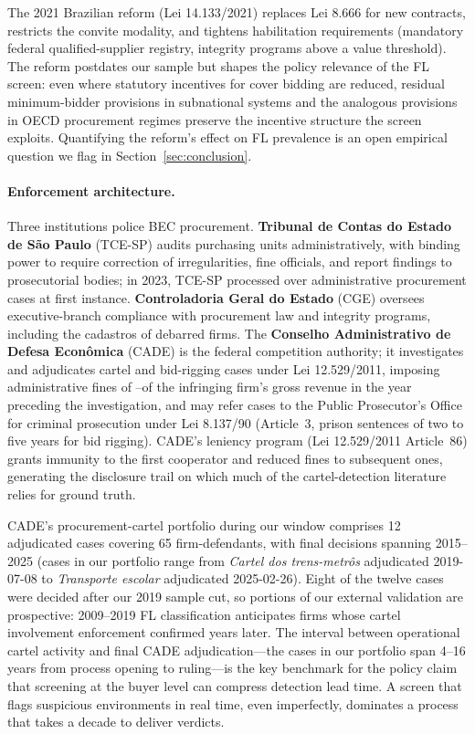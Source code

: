 The 2021 Brazilian reform (Lei 14.133/2021) replaces Lei 8.666
for new contracts, restricts the convite modality, and
tightens habilitation requirements (mandatory federal
qualified-supplier registry, integrity programs above a value
threshold). The reform postdates our sample but shapes the
policy relevance of the FL screen: even where statutory
incentives for cover bidding are reduced, residual minimum-bidder
provisions in subnational systems and the analogous provisions
in OECD procurement regimes preserve the incentive structure
the screen exploits. Quantifying the reform's effect on FL
prevalence is an open empirical question we flag in
Section~\ref{sec:conclusion}.

\paragraph{Enforcement architecture.}
Three institutions police BEC procurement.
\textbf{Tribunal de Contas do Estado de S\~ao Paulo} (TCE-SP)
audits purchasing units administratively, with binding power to
require correction of irregularities, fine officials, and report
findings to prosecutorial bodies; in 2023, TCE-SP processed
over \valPBUcount administrative procurement cases at first
instance. \textbf{Controladoria Geral do Estado} (CGE) oversees
executive-branch compliance with procurement law and integrity
programs, including the cadastros of debarred firms. The
\textbf{Conselho Administrativo de Defesa Econ\^omica} (CADE)
is the federal competition authority; it investigates and
adjudicates cartel and bid-rigging cases under Lei 12.529/2011,
imposing administrative fines of \valAdminCost--\valPctTwenty of the
infringing firm's gross revenue in the year preceding the
investigation, and may refer cases to the Public Prosecutor's
Office for criminal prosecution under Lei 8.137/90 (Article~3,
prison sentences of two to five years for bid rigging).
CADE's leniency program (Lei 12.529/2011 Article~86) grants
immunity to the first cooperator and reduced fines to subsequent
ones, generating the disclosure trail on which much of the
cartel-detection literature relies for ground truth.

CADE's procurement-cartel portfolio during our window comprises
12 adjudicated cases covering 65 firm-defendants, with final
decisions spanning 2015--2025 (cases in our portfolio range
from \emph{Cartel dos trens-metr\^os} adjudicated 2019-07-08 to
\emph{Transporte escolar} adjudicated 2025-02-26). Eight of the
twelve cases were decided after our 2019 sample cut, so portions
of our external validation are prospective: 2009--2019 FL
classification anticipates firms whose cartel involvement
enforcement confirmed years later. The interval between
operational cartel activity and final CADE adjudication---the
cases in our portfolio span 4--16 years from process opening to
ruling---is the key benchmark for the policy claim that
screening at the buyer level can compress detection lead time.
A screen that flags suspicious environments in real time, even
imperfectly, dominates a process that takes a decade to deliver
verdicts.

